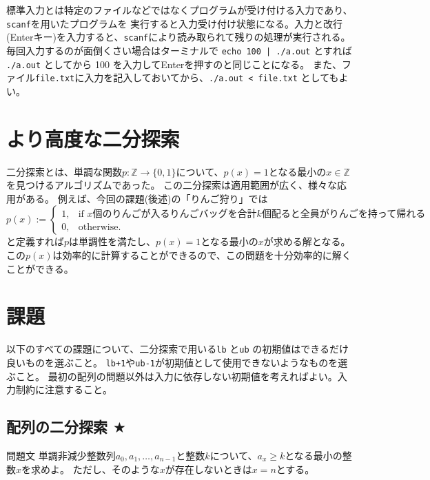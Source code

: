\documentclass[a4paper,twoside,onecolumn,openany,article,10pt]{memoir}
\theoremstyle{remark}
\begin{document}
標準入力とは特定のファイルなどではなくプログラムが受け付ける入力であり、\texttt{scanf}を用いたプログラムを
実行すると入力受け付け状態になる。入力と改行(Enterキー)を入力すると、\texttt{scanf}により読み取られて残りの処理が実行される。
毎回入力するのが面倒くさい場合はターミナルで \texttt{echo 100 | ./a.out} とすれば \texttt{./a.out} としてから 100 を入力してEnterを押すのと同じことになる。
また、ファイル\texttt{file.txt}に入力を記入しておいてから、\texttt{./a.out < file.txt} としてもよい。

\section{より高度な二分探索}
二分探索とは、単調な関数$p\colon \mathbb{Z}\to\{0,1\}$について、$p(x)=1$となる最小の$x\in\mathbb{Z}$を見つけるアルゴリズムであった。
この二分探索は適用範囲が広く、様々な応用がある。
例えば、今回の課題(後述)の「りんご狩り」では
\begin{equation*}
p(x) := \begin{cases}
1,& \text{if $x$個のりんごが入るりんごバッグを合計$k$個配ると全員がりんごを持って帰れる}\\
0,& \text{otherwise.}
\end{cases}
\end{equation*}
と定義すれば$p$は単調性を満たし、$p(x)=1$となる最小の$x$が求める解となる。
この$p(x)$は効率的に計算することができるので、この問題を十分効率的に解くことができる。



\section{課題}\label{sec:assign}
以下のすべての課題について、二分探索で用いる\texttt{lb} と\texttt{ub} の初期値はできるだけ良いものを選ぶこと。
\texttt{lb+1}や\texttt{ub-1}が初期値として使用できないようなものを選ぶこと。
最初の配列の問題以外は入力に依存しない初期値を考えればよい。入力制約に注意すること。

\clearpage
\subsection{配列の二分探索 $\bigstar$}
\begin{itembox}[l]{問題文}
単調非減少整数列$a_0, a_1,\dotsc, a_{n-1}$と整数$k$について、$a_x\ge k$となる最小の整数$x$を求めよ。
ただし、そのような$x$が存在しないときは$x=n$とする。
\end{itembox}
\end{document}
